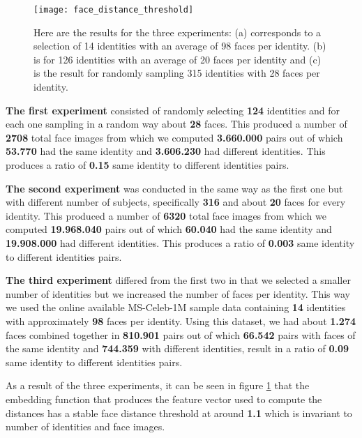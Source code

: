 \begin{figure}[H]
	\captionsetup{width=15cm,font=small}
	\begin{center}
		\texttt{[image: face\_distance\_threshold]}
	\end{center}
	\caption[Faces distances histograms]{Here are the results for the three experiments: (a) corresponds to a selection of 14 identities with an average of 98 faces per identity. (b) is for 126 identities with an average of 20 faces per identity and (c) is the result for randomly sampling 315 identities with 28 faces per identity.}
	\label{fig:face_distance_threshold}
\end{figure}

\textbf{The first experiment} consisted of randomly selecting \textbf{124} identities and for each one sampling in a random way about \textbf{28} faces. This produced a number of \textbf{2708} total face images from which we computed \textbf{3.660.000} pairs out of which \textbf{53.770} had the same identity and \textbf{3.606.230} had different identities. This produces a ratio of \textbf{0.15} same identity to different identities pairs.

\textbf{The second experiment} was conducted in the same way as the first one but with different number of subjects, specifically \textbf{316} and about \textbf{20} faces for every identity. This produced a number of \textbf{6320} total face images from which we computed \textbf{19.968.040} pairs out of which \textbf{60.040} had the same identity and \textbf{19.908.000} had different identities. This produces a ratio of \textbf{0.003} same identity to different identities pairs.

\textbf{The third experiment} differed from the first two in that we selected a smaller number of identities but we increased the number of faces per identity. This way we used the online available MS-Celeb-1M sample data containing \textbf{14} identities with approximately \textbf{98} faces per identity. Using this dataset, we had about \textbf{1.274} faces combined together in \textbf{810.901} pairs out of which \textbf{66.542} pairs with faces of the same identity and \textbf{744.359} with different identities, result in a ratio of \textbf{0.09} 	same identity to different identities pairs.


As a result of the three experiments, it can be seen in figure \ref{fig:face_distance_threshold} that the embedding function that produces the feature vector used to compute the distances has a stable face distance threshold at around \textbf{1.1} which is invariant to number of identities and face images.